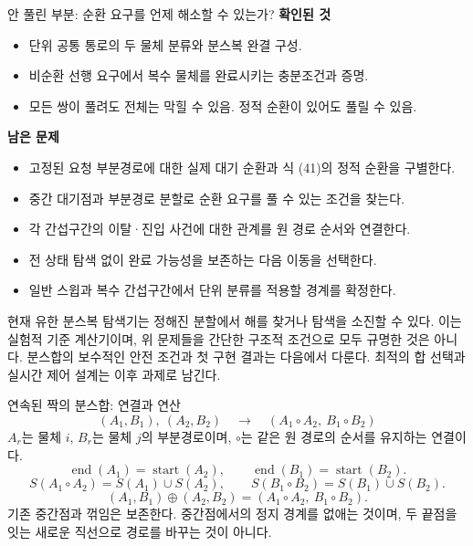 \begin{frame}{안 풀린 부분: 순환 요구를 언제 해소할 수 있는가?}
\small
\textbf{확인된 것}
\begin{itemize}
\item 단위 공통 통로의 두 물체 분류와 분스복 완결 구성.
\item 비순환 선행 요구에서 복수 물체를 완료시키는 충분조건과 증명.
\item 모든 쌍이 풀려도 전체는 막힐 수 있음. 정적 순환이 있어도 풀릴 수 있음.
\end{itemize}
\par\medskip
\textbf{남은 문제}
\begin{itemize}
\item 고정된 요청 부분경로에 대한 실제 대기 순환과 식 (41)의 정적 순환을 구별한다.
\item 중간 대기점과 부분경로 분할로 순환 요구를 풀 수 있는 조건을 찾는다.
\item 각 간섭구간의 이탈·진입 사건에 대한 관계를 원 경로 순서와 연결한다.
\item 전 상태 탐색 없이 완료 가능성을 보존하는 다음 이동을 선택한다.
\item 일반 스윕과 복수 간섭구간에서 단위 분류를 적용할 경계를 확정한다.
\end{itemize}
\par\medskip\footnotesize
현재 유한 분스복 탐색기는 정해진 분할에서 해를 찾거나 탐색을 소진할 수 있다.
이는 실험적 기준 계산기이며, 위 문제들을 간단한 구조적 조건으로 모두 규명한 것은 아니다.
분스합의 보수적인 안전 조건과 첫 구현 결과는 다음에서 다룬다.
최적의 합 선택과 실시간 제어 설계는 이후 과제로 남긴다.
\end{frame}


\begin{frame}{연속된 짝의 분스합: 연결과 연산}
\small
\[
 (A_1,B_1),\ (A_2,B_2)
 \quad\longrightarrow\quad (A_1\circ A_2,\ B_1\circ B_2)
\]
$A_r$는 물체 $i$, $B_r$는 물체 $j$의 부분경로이며,
$\circ$는 같은 원 경로의 순서를 유지하는 연결이다.
\begin{equation}
 \operatorname{end}(A_1)=\operatorname{start}(A_2),\qquad
 \operatorname{end}(B_1)=\operatorname{start}(B_2).
 \tag{43}\label{eq:merge-continuity}
\end{equation}
\begin{equation}
 S(A_1\circ A_2)=S(A_1)\cup S(A_2),\qquad
 S(B_1\circ B_2)=S(B_1)\cup S(B_2).
 \tag{44}\label{eq:merge-sweep-union}
\end{equation}
\begin{equation}
 \boxed{(A_1,B_1)\oplus(A_2,B_2)
       =(A_1\circ A_2,\ B_1\circ B_2).}
 \tag{45}\label{eq:pair-merge}
\end{equation}
기존 중간점과 꺾임은 보존한다. 중간점에서의 정지 경계를 없애는 것이며,
두 끝점을 잇는 새로운 직선으로 경로를 바꾸는 것이 아니다.
\end{frame}

